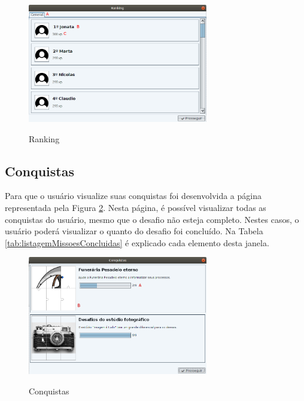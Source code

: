 \documentclass[
	12pt,				%
	oneside,			%
	a4paper,			%
	english,			%
	french,				%
	spanish,			%
	brazil,				%
	]{abntex2}
\begin{document}
\begin{figure}[H]
\centering
\caption{Ranking}
\includegraphics[width=0.7\textwidth]{imagens/visnode_ranking.png}
\sourceAuthor
\label{fig:visnodeRanking}
\end{figure}

\subsection{Conquistas}

Para que o usuário visualize suas conquistas foi desenvolvida a página representada pela Figura \ref{fig:visnodeConquistas}. Nesta página, é possível visualizar todas as conquistas do usuário, mesmo que o desafio não esteja completo. Nestes casos, o usuário poderá visualizar o quanto do desafio foi concluído. Na Tabela \ref{tab:listagemMissoesConcluidas} é explicado cada elemento desta janela.

\begin{figure}[H]
\centering
\caption{Conquistas}
\includegraphics[width=0.7\textwidth]{imagens/visnode_conquistas.png}
\sourceAuthor
\label{fig:visnodeConquistas}
\end{figure}
\end{document}
